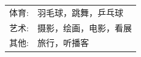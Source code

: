 %
%



\begin{tabular}{rl}
    \textsc{体育:} & 羽毛球，跳舞，乒乓球 \\
    \textsc{艺术:} & 摄影，绘画，电影，看展 \\ 
    \textsc{其他:} & 旅行，听播客\\
\end{tabular}
